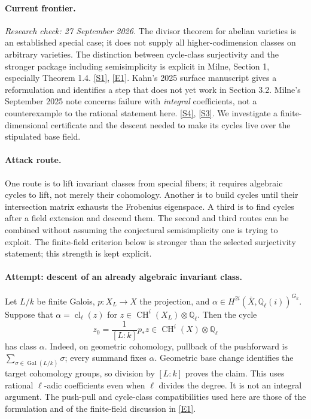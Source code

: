 \documentclass[11pt,a4paper]{article}
\newcommand{\Q}{\mathbb{Q}}
\newcommand{\sref}[2]{\hyperlink{source:#1:#2}{[S#2]}}
\newcommand{\eref}[2]{\hyperlink{extra:#1:#2}{[E#2]}}
\begin{document}
\paragraph{Current frontier.}
\textit{Research check: 27 September 2026.}
The divisor theorem for abelian varieties is an established special case;
it does not supply all higher-codimension classes on arbitrary varieties.
The distinction between cycle-class surjectivity and the stronger package
including semisimplicity is explicit in Milne, Section 1, especially
Theorem 1.4. \sref{30006680}{1}, \eref{30006680}{1}.
Kahn's 2025 surface manuscript gives a reformulation and identifies a step
that does not yet work in Section 3.2. Milne's September 2025 note concerns
failure with \emph{integral} coefficients, not a counterexample to the
rational statement here. \sref{30006680}{4}, \sref{30006680}{3}.
We investigate a finite-dimensional certificate and the descent needed to
make its cycles live over the stipulated base field.

\paragraph{Attack route.}
One route is to lift invariant classes from special fibers; it requires
algebraic cycles to lift, not merely their cohomology. Another is to build
cycles until their intersection matrix exhausts the Frobenius eigenspace.
A third is to find cycles after a field extension and descend them. The
second and third routes can be combined without assuming the conjectural
semisimplicity one is trying to exploit. The finite-field criterion below
is stronger than the selected surjectivity statement; this strength is
kept explicit.

\paragraph{Attempt: descent of an already algebraic invariant class.}
Let $L/k$ be finite Galois, $p:X_L\to X$ the projection, and
$\alpha\in H^{2i}(\bar X,\Q_\ell(i))^{G_k}$. Suppose that
$\alpha=\operatorname{cl}_\ell(z)$ for
$z\in\operatorname{CH}^i(X_L)\otimes\Q_\ell$.
Then the cycle
\[
 z_0=\frac{1}{[L:k]}p_*z\in\operatorname{CH}^i(X)\otimes\Q_\ell
 \tag{15.1}
\]
has class $\alpha$. Indeed, on geometric cohomology, pullback of the
pushforward is $\sum_{\sigma\in\operatorname{Gal}(L/k)}\sigma$; every
summand fixes $\alpha$. Geometric base change identifies the target
cohomology groups, so division by $[L:k]$ proves the claim. This uses
rational $\ell$-adic coefficients even when $\ell$ divides the degree.
It is not an integral argument. The push-pull and cycle-class
compatibilities used here are those of the formulation and of the
finite-field discussion in \eref{30006680}{1}.
\end{document}
